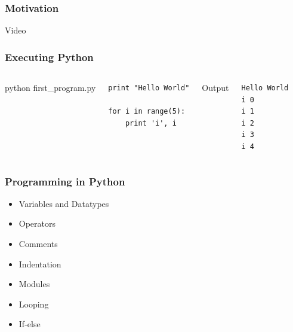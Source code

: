 \begin{frame}[fragile]

    \frametitle{Motivation}

    \begin{center}
        Video %
    \end{center}

\end{frame}


\begin{frame}[fragile]

    \frametitle{Executing Python}

    \begin{columns}[t]


            \begin{center}
                python first\_program.py
            \end{center}

\begin{lstlisting}
print "Hello World"

for i in range(5):
    print 'i', i
\end{lstlisting}


            \begin{center}
                Output
            \end{center}

\begin{lstlisting}
Hello World
i 0
i 1
i 2
i 3
i 4
\end{lstlisting}


    \end{columns}


\end{frame}



\begin{frame}[fragile]

    \frametitle{Programming in Python}

    \begin{itemize}
        \item Variables and Datatypes
        \item Operators
        \item Comments
        \item Indentation
        \item Modules
        \item Looping
        \item If-else
    \end{itemize}

\end{frame}


